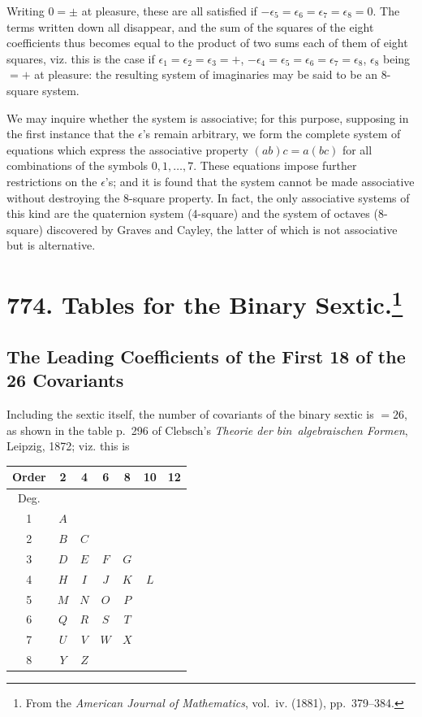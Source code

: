 \documentclass[11pt,a4paper]{book}
\begin{document}
Writing $0 = \pm$ at pleasure, these are all satisfied if $-\epsilon_5 = \epsilon_6 = \epsilon_7 = \epsilon_8 = 0$. The terms written down all disappear, and the sum of the squares of the eight coefficients thus becomes equal to the product of two sums each of them of eight squares, viz. this is the case if $\epsilon_1 = \epsilon_2 = \epsilon_3 = +$, $-\epsilon_4 = \epsilon_5 = \epsilon_6 = \epsilon_7 = \epsilon_8$, $\epsilon_8$ being $= +$ at pleasure: the resulting system of imaginaries may be said to be an 8-square system.

We may inquire whether the system is associative; for this purpose, supposing in the first instance that the $\epsilon$'s remain arbitrary, we form the complete system of equations which express the associative property $(ab)c = a(bc)$ for all combinations of the symbols $0, 1, \dots, 7$. These equations impose further restrictions on the $\epsilon$'s; and it is found that the system cannot be made associative without destroying the 8-square property. In fact, the only associative systems of this kind are the quaternion system (4-square) and the system of octaves (8-square) discovered by Graves and Cayley, the latter of which is not associative but is alternative.

\newpage
\section[Tables for the Binary Sextic]{774. Tables for the Binary Sextic.\footnote{From the \textit{American Journal of Mathematics}, vol.~iv. (1881), pp.~379--384.}}

\subsection*{The Leading Coefficients of the First 18 of the 26 Covariants}

Including the sextic itself, the number of covariants of the binary sextic is $= 26$, as shown in the table p.~296 of Clebsch's \textit{Theorie der bin\ algebraischen Formen}, Leipzig, 1872; viz. this is

\begin{center}
\begin{tabular}{c|cccccc}
\toprule
Order & 2 & 4 & 6 & 8 & 10 & 12 \\
\midrule
Deg. & & & & & & \\
1 & $A$ & & & & & \\
2 & $B$ & $C$ & & & & \\
3 & $D$ & $E$ & $F$ & $G$ & & \\
4 & $H$ & $I$ & $J$ & $K$ & $L$ & \\
5 & $M$ & $N$ & $O$ & $P$ & & \\
6 & $Q$ & $R$ & $S$ & $T$ & & \\
7 & $U$ & $V$ & $W$ & $X$ & & \\
8 & $Y$ & $Z$ & & & & \\
\bottomrule
\end{tabular}
\end{center}
\end{document}
